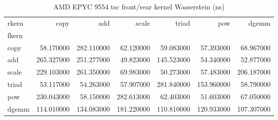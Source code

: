 \begin{table}
\caption{AMD EPYC 9554 tsc front/rear kernel Wasserstein (ns)}
\begin{tabular}{lrrrrrr}
\toprule
rkern & copy & add & scale & triad & pow & dgemm \\
fkern &  &  &  &  &  &  \\
\midrule
copy & 58.170000 & 282.110000 & 62.120000 & 59.083000 & 57.393000 & 68.967000 \\
add & 265.327000 & 251.277000 & 49.823000 & 145.523000 & 54.340000 & 52.877000 \\
scale & 229.103000 & 261.350000 & 69.983000 & 50.273000 & 57.483000 & 206.187000 \\
triad & 53.117000 & 54.263000 & 57.907000 & 281.840000 & 153.960000 & 58.790000 \\
pow & 230.043000 & 58.150000 & 282.613000 & 62.403000 & 51.603000 & 67.050000 \\
dgemm & 114.010000 & 134.083000 & 181.220000 & 110.810000 & 120.933000 & 107.307000 \\
\bottomrule
\end{tabular}
\end{table}
